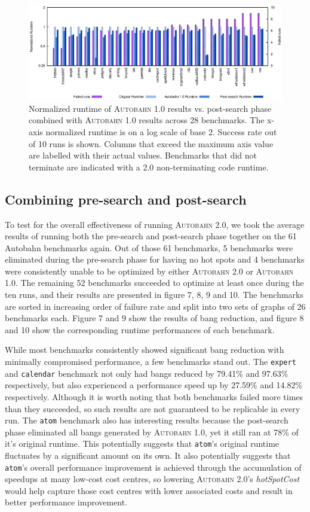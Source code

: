 \documentclass[format=sigplan, review=true]{acmart}
\newcommand{\hotspots}[0]{hot spots}
\newcommand{\hotspotcost}[0]{\textit{hotSpotCost}}
\newcommand{\Ao}[0]{\textsc{Autobahn 1.0}}
\newcommand{\At}[0]{\textsc{Autobahn 2.0}}
\newcommand{\preopt}[0]{pre-search}
\newcommand{\postopt}[0]{post-search}
\newcommand{\nonterm}[0]{non-terminating}
\begin{document}
\begin{figure}
\includegraphics[width=\textwidth]{ap-partial}
\caption{Normalized runtime of \Ao{} results vs. \postopt{} phase combined with \Ao{} results across 28 benchmarks. The x-axis normalized runtime is on a log scale of base 2. Success rate out of 10 runs is shown. Columns that exceed the maximum axis value are labelled with their actual values. Benchmarks that did not terminate are indicated with a 2.0 \nonterm{} code runtime.}
\end{figure}

\subsection{Combining \preopt{} and \postopt{}}

To test for the overall effectiveness of running \At{}, we took the average results of running both the \preopt{} and \postopt{} phase together on the 61 Autobahn benchmarks again. Out of those 61 benchmarks, 5 benchmarks were eliminated during the \preopt{} phase for having no \hotspots{} and 4 benchmarks were consistently unable to be optimized by either \At{} or \Ao{}. The remaining 52 benchmarks succeeded to optimize at least once during the ten runs, and their results are presented in figure 7, 8, 9 and 10. The benchmarks are sorted in increasing order of failure rate and split into two sets of graphs of 26 benchmarks each. Figure 7 and 9 show the results of bang reduction, and figure 8 and 10 show the corresponding runtime performances of each benchmark. 

While most benchmarks consistently showed significant bang reduction with minimally compromised performance, a few benchmarks stand out. The \texttt{expert} and \texttt{calendar} benchmark not only had bangs reduced by 79.41\% and 97.63\% respectively, but also experienced a performance speed up by 27.59\% and 14.82\% respectively. Although it is worth noting that both benchmarks failed more times than they succeeded, so such results are not guaranteed to be replicable in every run. The \texttt{atom} benchmark also has interesting results because the \postopt{} phase eliminated all bangs generated by \Ao{}, yet it still ran at 78\% of it's original runtime. This potentially suggests that \texttt{atom}'s original runtime fluctuates by a significant amount on its own. It also potentially suggests that \texttt{atom}'s overall performance improvement is achieved through the accumulation of speedups at many low-cost cost centres, so lowering \At{}'s \hotspotcost{} would help capture those cost centres with lower associated costs and result in better performance improvement.
\end{document}
